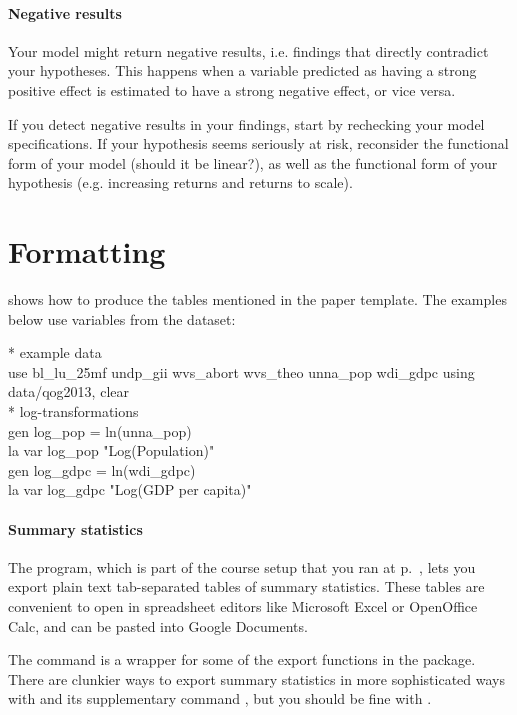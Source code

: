 \paragraph{Negative results} Your model might return negative results, i.e. findings that directly contradict your hypotheses. This happens when a variable predicted as having a strong positive effect is estimated to have a strong negative effect, or vice versa.%

  If you detect negative results in your findings, start by rechecking your model specifications. If your hypothesis seems seriously at risk, reconsider the functional form of your model (should it be linear?), as well as the functional form of your hypothesis (e.g. increasing returns and returns to scale).%

%

\section{Formatting}

 shows how to produce the tables mentioned in the paper template. The examples below use variables from the \qog{} dataset:%

\begin{docspec}
  * example data\\%
  use bl\_lu\_25mf undp\_gii wvs\_abort wvs\_theo unna\_pop wdi\_gdpc using data/qog2013, clear\\%
  * log-transformations\\%
  gen log\_pop = ln(unna\_pop)\\%
  la var log\_pop "Log(Population)"\\%
  gen log\_gdpc = ln(wdi\_gdpc)\\%
  la var log\_gdpc "Log(GDP per capita)"
\end{docspec}

%
\paragraph{Summary statistics}%
  The  program, which is part of the course setup that you ran at p.~\pageref{sec:course-setup}, lets you export plain text tab-separated tables of summary statistics. These tables are convenient to open in spreadsheet editors like Microsoft Excel or OpenOffice Calc, and can be pasted into Google Documents.%

  The  command is a wrapper for some of the export functions in the  package. There are clunkier ways to export summary statistics in more sophisticated ways with  and its supplementary command , but you should be fine with .%

